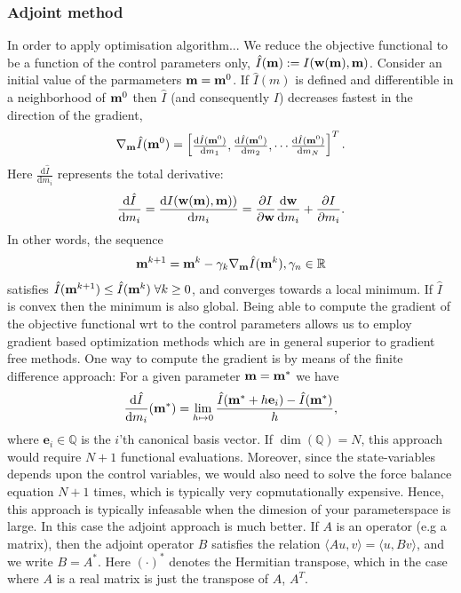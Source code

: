 \subsubsection{Adjoint method}
In order to apply optimisation algorithm...
We reduce the objective functional to be a function of the control
parameters only, $\hat{I}(\mathbf{m}) := I(\mathbf{w}(\mathbf{m}), \mathbf{m})$. Consider an
initial value of the parmameters $\mathbf{m} = \mathbf{m}^0$. If $\hat{I}(m)$ is defined
and differentible in a neighborhood of $\mathbf{m}^0$ then $\hat{I}$ (and
consequently $I$) decreases fastest in the direction of the gradient, 
\begin{align}
  \nabla_{\mathbf{m}} \hat{I}(\mathbf{m}^0) = \begin{bmatrix}
    \frac{\mathrm{d} \hat{I}(\mathbf{m}^0) }{\mathrm{d} m_1},
    \frac{\mathrm{d} \hat{I}(\mathbf{m}^0) }{\mathrm{d} m_2},
    \cdots
    \frac{\mathrm{d} \hat{I}(\mathbf{m}^0) }{\mathrm{d} m_N}
  \end{bmatrix}^T.
  \label{eq:functional_gradient}
\end{align}
Here $\frac{\mathrm{d} \hat{I} }{\mathrm{d} m_i}$ represents the
total derivative:
\begin{align}
  \frac{\mathrm{d} \hat{I} }{\mathrm{d} m_i} = \frac{\mathrm{d} I (\mathbf{w}(\mathbf{m}), \mathbf{m}))}{\mathrm{d} m_i} = \frac{\partial  I }{\partial \mathbf{w}} \frac{\mathrm{d} \mathbf{w}}{\mathrm{d} m_i} + \frac{\partial  I }{\partial m_i}.
  \label{eq:functional_derivative_component}
\end{align}
In other words, the sequence
\begin{align}
  \mathbf{m}^{k+1} = \mathbf{m}^{k} - \gamma_k \nabla_{\mathbf{m}} \hat{I}(\mathbf{m}^k), \gamma_n \in \mathbb{R}
\end{align}
satisfies $\hat{I}(\mathbf{m}^{k+1}) \leq \hat{I}(\mathbf{m}^k) \; \forall k \geq
0$, and converges towards a local minimum. If $\hat{I}$ is convex then
the minimum is also global.
Being able to compute the gradient of the objective functional wrt to
the control parameters allows us to employ gradient based optimization
methods which are in general superior to gradient free methods.
One way to compute the gradient is by means of the finite difference
approach: For a given parameter $\mathbf{m} = \mathbf{m}^*$ we have
\begin{align}
  \frac{\mathrm{d} \hat{I} }{\mathrm{d} m_i}( \mathbf{m}^*) =
  \lim_{h \mapsto 0} \frac{\hat{I}(\mathbf{m}^* + h\mathbf{e}_i) - \hat{I}(\mathbf{m}^*)}{h}, 
\end{align}
where $\mathbf{e}_i \in \mathbb{Q}$ is the $i$'th canonical basis
vector. If $\dim(\mathbb{Q}) = N$, this approach would require $N+1$
functional evaluations. Moreover, since the state-variables depends upon the
control variables, we would also need to solve the force balance
equation $N+1$ times, which is typically very copmutationally
expensive. Hence, this approach is typically infeasable when the
dimesion of your parameterspace is large. In this case the adjoint
approach is much better. If $A$ is an operator (e.g a matrix), then
the adjoint operator $B$ satisfies the relation $\langle Au, v \rangle
= \langle u, Bv \rangle$, and we write $ B = A^*$. Here $(\cdot)^*$
denotes the Hermitian transpose, which in the case where $A$ is a real
matrix is just the transpose of $A$, $A^T$.  


